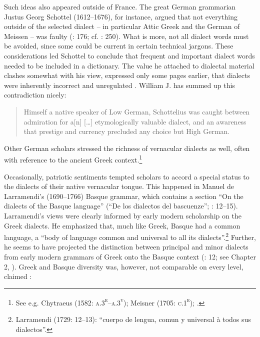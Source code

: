 \documentclass[output=paper]{langsci/langscibook}
\begin{document}
Such ideas also appeared outside of France. The great German grammarian Justus Georg Schottel (1612–1676), for instance, argued that not everything outside of the selected dialect – in particular Attic Greek and the German of Meissen – was faulty (\citealt{Schottel1663}: 176; cf. \citealt{Roelcke2014}: 250). What is more, not all dialect words must be avoided, since some could be current in certain technical jargons. These considerations led Schottel to conclude that frequent and important dialect words needed to be included in a dictionary. The value he attached to dialectal material clashes somewhat with his view, expressed only some pages earlier, that dialects were inherently incorrect and unregulated \citep[174]{Schottel1663}. William J. \citet[1110]{Jones2001} has summed up this contradiction nicely:

\begin{quote}
Himself a native speaker of Low German, Schottelius was caught between admiration for a[n] […] etymologically valuable dialect, and an awareness that prestige and currency precluded any choice but High German.
\end{quote}

Other German scholars stressed the richness of vernacular dialects as well, often with reference to the ancient Greek context.\footnote{See e.g. Chytraeus (1582: \textsc{a.3}\textsc{\textsuperscript{r}}\textsc{–a.3}\textsc{\textsuperscript{v}}); Meisner (1705: \textsc{c.1}\textsc{\textsuperscript{r}}); \citet[73]{Hertling1708}.}

Occasionally, patriotic sentiments tempted scholars to accord a special status to the dialects of their native vernacular tongue. This happened in Manuel de Larramendi’s (1690–1766) Basque grammar, which contains a section “On the dialects of the Basque language” (“De los dialectos del bascuenze”; \citealt{Larramendi1729}: 12–15). Larramendi’s views were clearly informed by early modern scholarship on the Greek dialects. He emphasized that, much like Greek, Basque had a common language, a “body of language common and universal to all its dialects”.\footnote{Larramendi (1729: 12–13): “cuerpo de lengua, comun y universal à todos sus dialectos”.} Further, he seems to have projected the distinction between principal and minor dialects from early modern grammars of Greek onto the Basque context (\citealt{Larramendi1729}: 12; see Chapter 2, ). Greek and Basque diversity was, however, not comparable on every level, claimed \citet[12]{Larramendi1729}:
\end{document}
